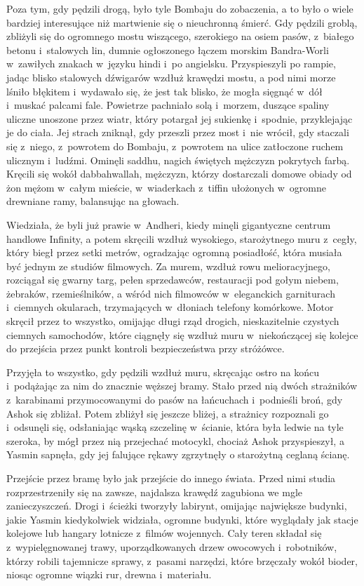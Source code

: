 \documentclass[oneside,polish,11pt,rmheadings]{mwbk}
\begin{document}
Poza tym, gdy pędzili drogą, było tyle Bombaju do zobaczenia, a to było o wiele bardziej interesujące niż martwienie się o nieuchronną śmierć. Gdy pędzili groblą, zbliżyli się do ogromnego mostu wiszącego, szerokiego na osiem pasów, z~białego betonu i~stalowych lin, dumnie ogłoszonego łączem morskim Bandra-Worli w~zawiłych znakach w~języku hindi i~po angielsku. Przyspieszyli po rampie, jadąc blisko stalowych dźwigarów wzdłuż krawędzi mostu, a pod nimi morze lśniło błękitem i~wydawało się, że jest tak blisko, że mogła sięgnąć w~dół i~muskać palcami fale. Powietrze pachniało solą i~morzem, duszące spaliny uliczne unoszone przez wiatr, który potargał jej sukienkę i~spodnie, przyklejając je do ciała. Jej strach zniknął, gdy przeszli przez most i~nie wrócił, gdy staczali się z~niego, z~powrotem do Bombaju, z~powrotem na ulice zatłoczone ruchem ulicznym i~ludźmi. Ominęli saddhu, nagich świętych mężczyzn pokrytych farbą. Kręcili się wokół dabbahwallah, mężczyzn, którzy dostarczali domowe obiady od żon mężom w~całym mieście, w~wiaderkach z~tiffin ułożonych w~ogromne drewniane ramy, balansując na głowach.

Wiedziała, że byli już prawie w~Andheri, kiedy minęli gigantyczne centrum handlowe Infinity, a potem skręcili wzdłuż wysokiego, starożytnego muru z~cegły, który biegł przez setki metrów, ogradzając ogromną posiadłość, która musiała być jednym ze studiów filmowych. Za murem, wzdłuż rowu melioracyjnego, rozciągał się gwarny targ, pełen sprzedawców, restauracji pod gołym niebem, żebraków, rzemieślników, a wśród nich filmowców w~eleganckich garniturach i~ciemnych okularach, trzymających w~dłoniach telefony komórkowe. Motor skręcił przez to wszystko, omijając długi rząd drogich, nieskazitelnie czystych ciemnych samochodów, które ciągnęły się wzdłuż muru w~niekończącej się kolejce do przejścia przez punkt kontroli bezpieczeństwa przy stróżówce.

Przyjęła to wszystko, gdy pędzili wzdłuż muru, skręcając ostro na końcu i~podążając za nim do znacznie węższej bramy. Stało przed nią dwóch strażników z~karabinami przymocowanymi do pasów na łańcuchach i~podnieśli broń, gdy Ashok się zbliżał. Potem zbliżył się jeszcze bliżej, a strażnicy rozpoznali go i~odsunęli się, odsłaniając wąską szczelinę w~ścianie, która była ledwie na tyle szeroka, by mógł przez nią przejechać motocykl, chociaż Ashok przyspieszył, a Yasmin sapnęła, gdy jej falujące rękawy zgrzytnęły o starożytną ceglaną ścianę.

Przejście przez bramę było jak przejście do innego świata. Przed nimi studia rozprzestrzeniły się na zawsze, najdalsza krawędź zagubiona we mgle zanieczyszczeń. Drogi i~ścieżki tworzyły labirynt, omijając największe budynki, jakie Yasmin kiedykolwiek widziała, ogromne budynki, które wyglądały jak stacje kolejowe lub hangary lotnicze z~filmów wojennych. Cały teren składał się z~wypielęgnowanej trawy, uporządkowanych drzew owocowych i~robotników, którzy robili tajemnicze sprawy, z~pasami narzędzi, które brzęczały wokół bioder, niosąc ogromne wiązki rur, drewna i~materiału.
\end{document}
